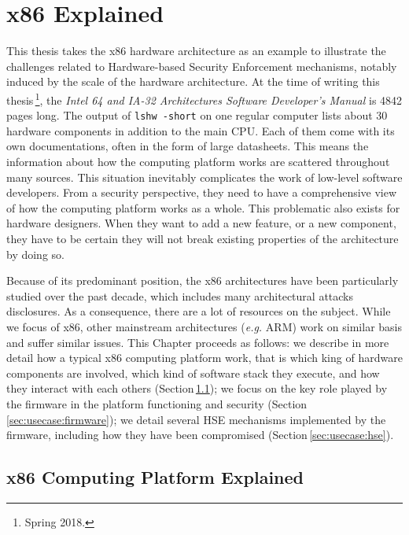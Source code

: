 \chapter{x86 Explained}
\label{chapter:usecase}

This thesis takes the x86 hardware architecture as an example to illustrate the
challenges related to Hardware-based Security Enforcement mechanisms, notably
induced by the scale of the hardware architecture.
%
At the time of writing this thesis\,\footnote{Spring 2018.}, the \emph{Intel 64
  and IA-32 Architectures Software Developer’s Manual} is 4842 pages long.
%
The output of \texttt{lshw -short} on one regular computer lists about 30
hardware components in addition to the main CPU.
%
Each of them come with its own documentations, often in the form of large
datasheets.
%
This means the information about how the computing platform works are scattered
throughout many sources.
%
This situation inevitably complicates the work of low-level software developers.
%
From a security perspective, they need to have a comprehensive view of how the
computing platform works as a whole.
%
This problematic also exists for hardware designers.
%
When they want to add a new feature, or a new component, they have to be certain
they will not break existing properties of the architecture by doing so.

Because of its predominant position, the x86 architectures have been
particularly studied over the past decade, which includes many architectural
attacks disclosures.
%
As a consequence, there are a lot of resources on the subject.
%
While we focus of x86, other mainstream architectures (\emph{e.g.} ARM) work on
similar basis and suffer similar issues.
%
This Chapter proceeds as follows:
%
we describe in more detail how a typical x86 computing platform work, that is
which king of hardware components are involved, which kind of software stack
they execute, and how they interact with each others
(Section\,\ref{sec:usecase:architecture});
%
we focus on the key role played by the firmware in the platform functioning and
security (Section\,\ref{sec:usecase:firmware});
%
we detail several HSE mechanisms implemented by the firmware, including how they
have been compromised (Section\,\ref{sec:usecase:hse}).

\section{x86 Computing Platform Explained}
\label{sec:usecase:architecture}

